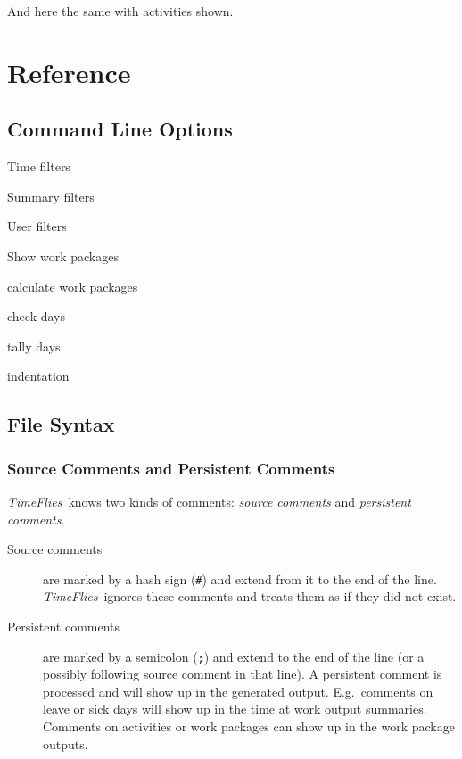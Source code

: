 \documentclass[11pt]{article}
\newcommand{\timeflies}{\emph{TimeFlies}}
\begin{document}


And here the same with activities shown.






\section{Reference}

\subsection{Command Line Options}

Time filters

Summary filters

User filters

Show work packages

calculate work packages

check days

tally days

indentation

\subsection{File Syntax}

\subsubsection{Source Comments and Persistent Comments}

\timeflies\ knows two kinds of comments: \emph{source comments} and \emph{persistent comments}.

\begin{description}
\item[Source comments] are marked by a hash sign (\verb:#:) and extend from it to the end of the line. \timeflies\ ignores these comments and treats them as if they did not exist.

\item[Persistent comments] are marked by a semicolon (\verb:;:) and extend to the end of the line (or a possibly following source comment in that line). A persistent comment is processed and will show up in the generated output. E.g.\ comments on leave or sick days will show up in the time at work output summaries. Comments on activities or work packages can show up in the work package outputs. 
\end{description}
\end{document}
